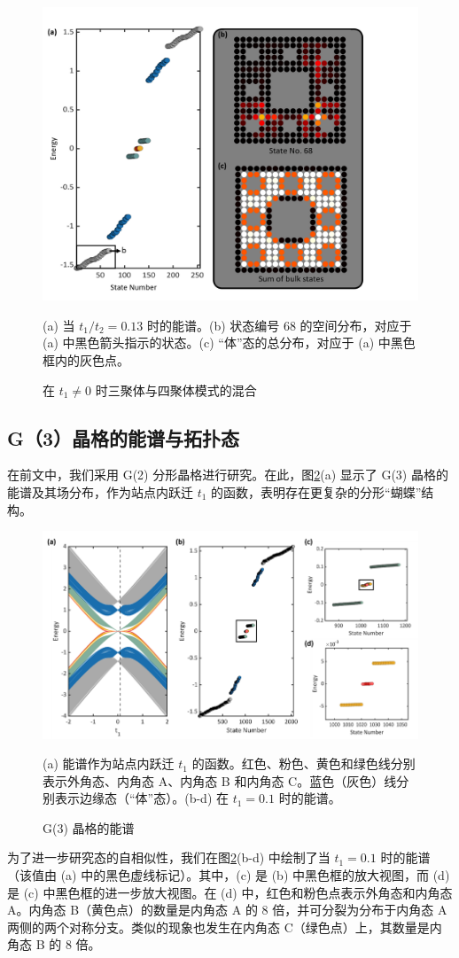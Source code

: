 \begin{figure}[htbp]
    \centering
    \includegraphics[width=0.6\linewidth]{figure/HOTITheo/MixElem.png}
    \caption{在 \( t_1 \neq 0 \) 时三聚体与四聚体模式的混合}(a) 当 \( t_1/t_2=0.13 \) 时的能谱。(b) 状态编号 68 的空间分布，对应于 (a) 中黑色箭头指示的状态。(c) “体”态的总分布，对应于 (a) 中黑色框内的灰色点。
    \label{fig:MixElem}
\end{figure}

\subsection{G（3）晶格的能谱与拓扑态}
在前文中，我们采用 G(2) 分形晶格进行研究。在此，图\ref{fig:G2Spec}(a) 显示了 G(3) 晶格的能谱及其场分布，作为站点内跃迁 \( t_1 \) 的函数，表明存在更复杂的分形“蝴蝶”结构。

\begin{figure}[htbp]
    \centering
    \includegraphics[width=0.75\linewidth]{figure/HOTITheo/G2Spec.png}
    \caption{G(3) 晶格的能谱}(a) 能谱作为站点内跃迁 \( t_1 \) 的函数。红色、粉色、黄色和绿色线分别表示外角态、内角态 A、内角态 B 和内角态 C。蓝色（灰色）线分别表示边缘态（“体”态）。(b-d) 在 \( t_1=0.1 \) 时的能谱。
    \label{fig:G2Spec}
\end{figure}

为了进一步研究态的自相似性，我们在图\ref{fig:G2Spec}(b-d) 中绘制了当 \( t_1=0.1 \) 时的能谱（该值由 (a) 中的黑色虚线标记）。其中，(c) 是 (b) 中黑色框的放大视图，而 (d) 是 (c) 中黑色框的进一步放大视图。在 (d) 中，红色和粉色点表示外角态和内角态 A。内角态 B（黄色点）的数量是内角态 A 的 8 倍，并可分裂为分布于内角态 A 两侧的两个对称分支。类似的现象也发生在内角态 C（绿色点）上，其数量是内角态 B 的 8 倍。

